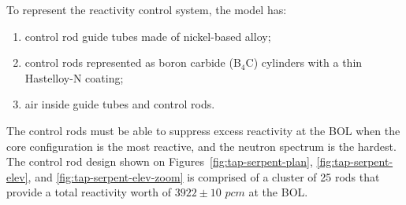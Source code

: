 To represent the reactivity control system, the model has: 
\begin{enumerate}[label=(\alph*), noitemsep, topsep=0pt]
	\item control rod guide tubes made of nickel-based alloy;
	\item control rods represented as boron carbide (B$_4$C) cylinders 
	with a thin Hastelloy-N coating;
	\item air inside guide tubes and control rods.
\end{enumerate}
The control rods must be able to suppress excess reactivity at the \gls{BOL} 
when the core configuration is the most reactive, and the neutron spectrum is 
the hardest. The control rod design shown on 
Figures~\ref{fig:tap-serpent-plan}, \ref{fig:tap-serpent-elev}, and 
\ref{fig:tap-serpent-elev-zoom} is comprised of a cluster of 25 rods that 
provide a total reactivity worth of $3922\pm10$ $pcm$ at the \gls{BOL}.

